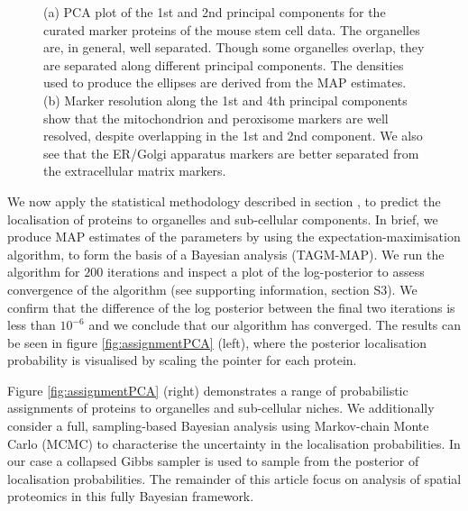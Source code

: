 \documentclass[12pt,english]{article}\usepackage[]{graphicx}\usepackage[]{color}
\newenvironment{knitrout}{}{} %
\begin{document}
\begin{figure}[p]
\begin{subfigure}[t]{0.45\textwidth}
\begin{knitrout}
\end{knitrout}
        \caption{}
\end{subfigure}
  \centering
  \caption{ (a) PCA plot of the 1st and 2nd principal components for
    the curated marker proteins of the mouse stem cell data. The
    organelles are, in general, well separated. Though some organelles
    overlap, they are separated along different principal
    components. The densities used to produce the ellipses are derived
    from the MAP estimates. (b) Marker resolution along the 1st and
    4th principal components show that the mitochondrion and
    peroxisome markers are well resolved, despite overlapping in the
    1st and 2nd component.  We also see that the ER/Golgi apparatus
    markers are better separated from the extracellular matrix
    markers.}
\label{figure::pcaellipse}
\end{figure}





We now apply the statistical methodology described in section
, to predict the localisation of proteins to
organelles and sub-cellular components. In brief, we produce MAP
estimates of the parameters by using the expectation-maximisation
algorithm, to form the basis of a Bayesian analysis (TAGM-MAP).  We
run the algorithm for $200$ iterations and inspect a plot of the
log-posterior to assess convergence of the algorithm (see supporting
information, section S3). We confirm that the difference of the log
posterior between the final two iterations is less than $10^{-6}$ and
we conclude that our algorithm has converged. The results can be seen
in figure \ref{fig:assignmentPCA} (left), where the posterior
localisation probability is visualised by scaling the pointer for each
protein.

Figure \ref{fig:assignmentPCA} (right) demonstrates a range of
probabilistic assignments of proteins to organelles and sub-cellular
niches. We additionally consider a full, sampling-based Bayesian
analysis using Markov-chain Monte Carlo (MCMC) to characterise the
uncertainty in the localisation probabilities.  In our case a
collapsed Gibbs sampler is used to sample from the posterior of
localisation probabilities. The remainder of this article focus on
analysis of spatial proteomics in this fully Bayesian framework.
\end{document}
